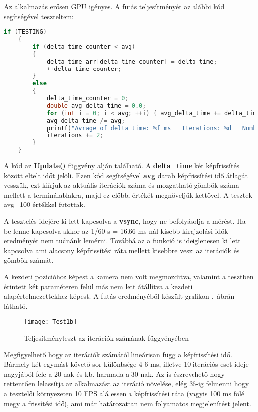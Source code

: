 Az alkalmazás erősen GPU igényes.  A futás teljesítményét az alábbi kód segítségével teszteltem:
\begin{lstlisting}[language={C++}]
if (TESTING)
	{
		if (delta_time_counter < avg)
		{
			delta_time_arr[delta_time_counter] = delta_time;
			++delta_time_counter;
		}
		else
		{
			delta_time_counter = 0;
			double avg_delta_time = 0.0;
			for (int i = 0; i < avg; ++i) { avg_delta_time += delta_time_arr[i]; }
			avg_delta_time /= avg;
			printf("Avrage of delta time: %f ms   Iterations: %d   Number of spheres: %d \n", avg_delta_time*1000, iterations, ballCount);
			iterations += 2;
		}
	}
\end{lstlisting}

A kód az \textbf{Update()} függvény alján található. A \textbf{delta\_time} két képfrissítés között eltelt időt jelöli. Ezen kód segítségével \textbf{avg} darab képfrissítési idő átlagát vesszük, ezt kiírjuk az aktuális iterációk száma és mozgatható gömbök száma mellett a terminálablakra, majd ez előbbi értékét megnöveljük kettővel. A tesztek avg=100 értékkel futottak.

A tesztelés idejére ki lett kapcsolva a \textbf{vsync}, hogy ne befolyásolja a mérést. Ha be lenne kapcsolva akkor az 1/60 s = 16.66 ms-nál kisebb kirajzolási idők eredményét nem tudnánk lemérni. Továbbá az a funkció is ideiglenesen ki lett kapcsolva ami alacsony képfrissítési ráta mellett kisebbre veszi az iterációk és gömbök számát.

A kezdeti pozícióhoz képest a kamera nem volt megmozdítva, valamint a tesztben érintett két paraméteren felül más nem lett átállítva a kezdeti alapértelmezettekhez képest. A futás eredményéből készült grafikon .~ábrán látható.

\begin{figure}[H]
	\centering
	\texttt{[image: Test1b]}
	\caption{Teljesítményteszt az iterációk számának függvényében}
	\label{fig:Test1}
\end{figure}


Megfigyelhető hogy az iterációk számától lineárisan függ a képfrissítési idő. Bármely két egymást követő sor különbsége 4-6 ms, illetve 10 iterációs eset ideje nagyjából fele a 20-nak és kb. harmada a 30-nak. Az is észrevehető hogy rettentően lelassítja az alkalmazást az iteráció növelése, elég 36-ig felmenni hogy a tesztelői környezeten 10 FPS alá essen a képfrissítési ráta (vagyis 100 ms fölé megy a frissítési idő), ami már határozattan nem folyamatos megjelenítést jelent.

